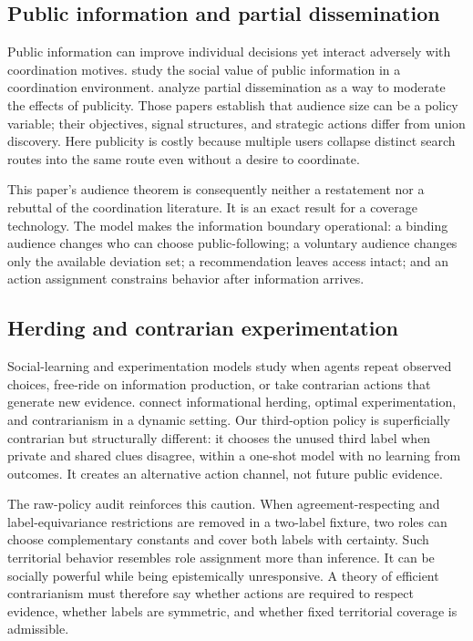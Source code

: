 \documentclass[11pt]{article}
\begin{document}
\subsection{Public information and partial dissemination}

Public information can improve individual decisions yet interact adversely
with coordination motives. \citet{MorrisShin2002} study the social value of
public information in a coordination environment. \citet{CornandHeinemann2008}
analyze partial dissemination as a way to moderate the effects of publicity.
Those papers establish that audience size can be a policy variable; their
objectives, signal structures, and strategic actions differ from union
discovery. Here publicity is costly because multiple users collapse distinct
search routes into the same route even without a desire to coordinate.

This paper's audience theorem is consequently neither a restatement nor a
rebuttal of the coordination literature. It is an exact result for a coverage
technology. The model makes the information boundary operational: a binding
audience changes who can choose public-following; a voluntary audience changes
only the available deviation set; a recommendation leaves access intact; and
an action assignment constrains behavior after information arrives.

\subsection{Herding and contrarian experimentation}

Social-learning and experimentation models study when agents repeat observed
choices, free-ride on information production, or take contrarian actions that
generate new evidence. \citet{SmithSorensenTian2021} connect informational
herding, optimal experimentation, and contrarianism in a dynamic setting. Our
third-option policy is superficially contrarian but structurally different: it
chooses the unused third label when private and shared clues disagree, within a
one-shot model with no learning from outcomes. It creates an alternative action
channel, not future public evidence.

The raw-policy audit reinforces this caution. When agreement-respecting and
label-equivariance restrictions are removed in a two-label fixture, two roles
can choose complementary constants and cover both labels with certainty. Such
territorial behavior resembles role assignment more than inference. It can be
socially powerful while being epistemically unresponsive. A theory of efficient
contrarianism must therefore say whether actions are required to respect
evidence, whether labels are symmetric, and whether fixed territorial coverage
is admissible.
\end{document}
